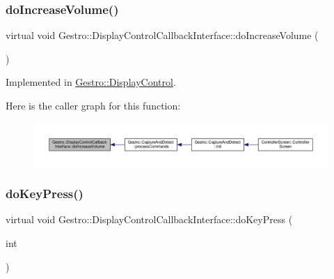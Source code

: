 \subsubsection{\texorpdfstring{do\+Increase\+Volume()}{doIncreaseVolume()}}
{\footnotesize\ttfamily virtual void Gestro\+::\+Display\+Control\+Callback\+Interface\+::do\+Increase\+Volume (\begin{DoxyParamCaption}{ }\end{DoxyParamCaption})\hspace{0.3cm}{\ttfamily [pure virtual]}}



Implemented in \hyperlink{class_gestro_1_1_display_control_a8a361b4c25ef55b86b5c2d178ffa516f}{Gestro\+::\+Display\+Control}.

Here is the caller graph for this function\+:
\nopagebreak
\begin{figure}[H]
\begin{center}
\leavevmode
\includegraphics[width=350pt]{class_gestro_1_1_display_control_callback_interface_af26f63171de9622c5723363732f590c8_icgraph}
\end{center}
\end{figure}
\mbox{\label{class_gestro_1_1_display_control_callback_interface_aa6d1e75bb4b3aa0b0e10497576b1053f}} 
\subsubsection{\texorpdfstring{do\+Key\+Press()}{doKeyPress()}}
{\footnotesize\ttfamily virtual void Gestro\+::\+Display\+Control\+Callback\+Interface\+::do\+Key\+Press (\begin{DoxyParamCaption}\item[{int}]{ }\end{DoxyParamCaption})\hspace{0.3cm}{\ttfamily [pure virtual]}}



